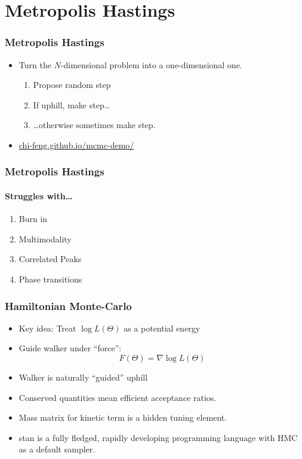 \documentclass[%
]{beamer}
\begin{document}
\section{Metropolis Hastings}


\begin{frame}
  \frametitle{Metropolis Hastings} 
  \begin{itemize}
      
    \item Turn the $N$-dimensional problem into a one-dimensional one.
      \begin{enumerate}
        \item Propose random step
        \item If uphill, make step\ldots
          
        \item \ldots otherwise sometimes make step. 
      \end{enumerate}
    \item \url{chi-feng.github.io/mcmc-demo/}
  \end{itemize}
\end{frame}


\begin{frame}
  \frametitle{Metropolis Hastings} 
  \framesubtitle{Struggles with\ldots}
  \pause
  \begin{enumerate}
      \item Burn in
      \item Multimodality
      \item Correlated Peaks
      \item Phase transitions
  \end{enumerate}
\end{frame}

\begin{frame}
  \frametitle{Hamiltonian Monte-Carlo} 
  \begin{itemize}
      \item Key idea: Treat $\log L(\Theta)$ as a potential energy
      \item Guide walker under ``force'': \[F(\Theta) =\nabla \log L(\Theta)\]
      \item Walker is naturally ``guided'' uphill
      \item Conserved quantities mean efficient acceptance ratios.
      \item Mass matrix for kinetic term is a hidden tuning element.
      \item stan is a fully fledged, rapidly developing programming language with HMC as a default sampler.
  \end{itemize}
\end{frame}
\end{document}

